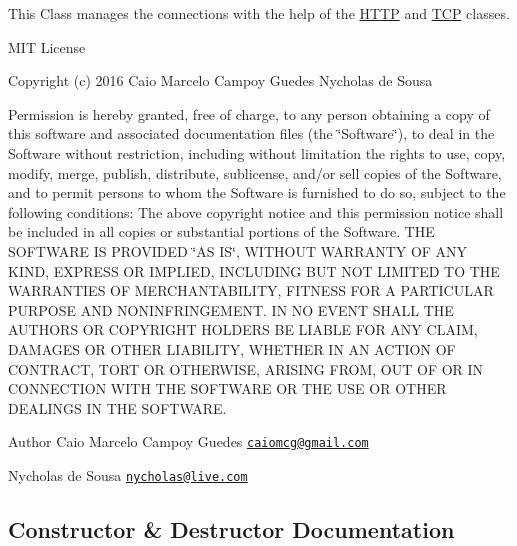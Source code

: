 This Class manages the connections with the help of the \hyperlink{class_h_t_t_p}{H\+T\+TP} and \hyperlink{class_t_c_p}{T\+CP} classes.

M\+IT License

Copyright (c) 2016 Caio Marcelo Campoy Guedes Nycholas de Sousa

Permission is hereby granted, free of charge, to any person obtaining a copy of this software and associated documentation files (the \char`\"{}\+Software\char`\"{}), to deal in the Software without restriction, including without limitation the rights to use, copy, modify, merge, publish, distribute, sublicense, and/or sell copies of the Software, and to permit persons to whom the Software is furnished to do so, subject to the following conditions\+: The above copyright notice and this permission notice shall be included in all copies or substantial portions of the Software. T\+HE S\+O\+F\+T\+W\+A\+RE IS P\+R\+O\+V\+I\+D\+ED \char`\"{}\+A\+S I\+S\char`\"{}, W\+I\+T\+H\+O\+UT W\+A\+R\+R\+A\+N\+TY OF A\+NY K\+I\+ND, E\+X\+P\+R\+E\+SS OR I\+M\+P\+L\+I\+ED, I\+N\+C\+L\+U\+D\+I\+NG B\+UT N\+OT L\+I\+M\+I\+T\+ED TO T\+HE W\+A\+R\+R\+A\+N\+T\+I\+ES OF M\+E\+R\+C\+H\+A\+N\+T\+A\+B\+I\+L\+I\+TY, F\+I\+T\+N\+E\+SS F\+OR A P\+A\+R\+T\+I\+C\+U\+L\+AR P\+U\+R\+P\+O\+SE A\+ND N\+O\+N\+I\+N\+F\+R\+I\+N\+G\+E\+M\+E\+NT. IN NO E\+V\+E\+NT S\+H\+A\+LL T\+HE A\+U\+T\+H\+O\+RS OR C\+O\+P\+Y\+R\+I\+G\+HT H\+O\+L\+D\+E\+RS BE L\+I\+A\+B\+LE F\+OR A\+NY C\+L\+A\+IM, D\+A\+M\+A\+G\+ES OR O\+T\+H\+ER L\+I\+A\+B\+I\+L\+I\+TY, W\+H\+E\+T\+H\+ER IN AN A\+C\+T\+I\+ON OF C\+O\+N\+T\+R\+A\+CT, T\+O\+RT OR O\+T\+H\+E\+R\+W\+I\+SE, A\+R\+I\+S\+I\+NG F\+R\+OM, O\+UT OF OR IN C\+O\+N\+N\+E\+C\+T\+I\+ON W\+I\+TH T\+HE S\+O\+F\+T\+W\+A\+RE OR T\+HE U\+SE OR O\+T\+H\+ER D\+E\+A\+L\+I\+N\+GS IN T\+HE S\+O\+F\+T\+W\+A\+RE.

\begin{DoxyAuthor}{Author}
Caio Marcelo Campoy Guedes \href{mailto:caiomcg@gmail.com}{\tt caiomcg@gmail.\+com} 

Nycholas de Sousa \href{mailto:nycholas@live.com}{\tt nycholas@live.\+com} 
\end{DoxyAuthor}


\subsection{Constructor \& Destructor Documentation}
